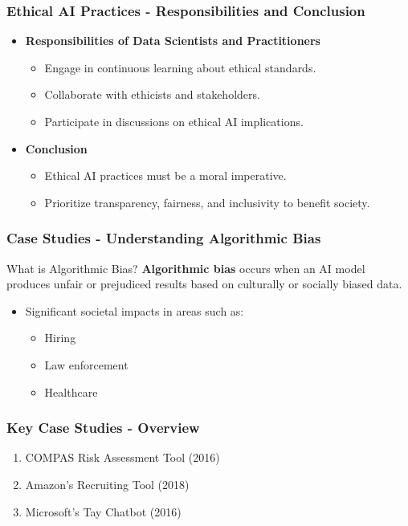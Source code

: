 \documentclass[aspectratio=169]{beamer}
\begin{document}
\begin{frame}[fragile]
    \frametitle{Ethical AI Practices - Responsibilities and Conclusion}
    \begin{itemize}
        \item \textbf{Responsibilities of Data Scientists and Practitioners}
            \begin{itemize}
                \item Engage in continuous learning about ethical standards.
                \item Collaborate with ethicists and stakeholders.
                \item Participate in discussions on ethical AI implications.
            \end{itemize}
        
        \item \textbf{Conclusion}
            \begin{itemize}
                \item Ethical AI practices must be a moral imperative.
                \item Prioritize transparency, fairness, and inclusivity to benefit society.
            \end{itemize}
    \end{itemize}
\end{frame}

\begin{frame}[fragile]
    \frametitle{Case Studies - Understanding Algorithmic Bias}
    \begin{block}{What is Algorithmic Bias?}
        \textbf{Algorithmic bias} occurs when an AI model produces unfair or prejudiced results based on culturally or socially biased data.
    \end{block}
    \begin{itemize}
        \item Significant societal impacts in areas such as:
        \begin{itemize}
            \item Hiring
            \item Law enforcement
            \item Healthcare
        \end{itemize}
    \end{itemize}
\end{frame}

\begin{frame}[fragile]
    \frametitle{Key Case Studies - Overview}
    \begin{enumerate}
        \item {COMPAS Risk Assessment Tool (2016)}
        \item {Amazon's Recruiting Tool (2018)}
        \item {Microsoft's Tay Chatbot (2016)}
    \end{enumerate}
\end{frame}
\end{document}
